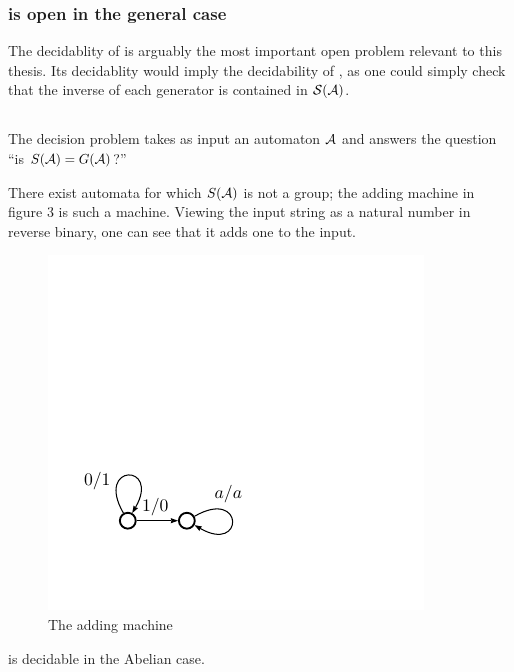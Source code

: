 \documentclass[11pt, titlepage]{article}
\begin{document}
\subsubsection{ is open in the general case}

The decidablity of  is arguably the most important
open problem relevant to this thesis. Its decidablity would imply the
decidability of , as one could simply check that the
inverse of each generator is contained in $\mathcal{S}(\mathcal{A})$.

\subsection{}
\begin{definition}
  The  decision problem takes as input an automaton
  $\mathcal{A}$ and answers the question ``is $S(\mathcal{A}) = G(\mathcal{A})$?''
\end{definition}

\begin{example}
  There exist automata for which $S(\mathcal{A})$ is not a group; the adding
  machine in figure 3 is such a machine. Viewing the input string as a
  natural number in reverse binary, one can see that it adds one to
  the input.
\end{example}
\begin{figure}
\begin{center}
\includegraphics[scale=0.7]{figures/adder}
\end{center}
\caption{The adding machine}
\end{figure}

\begin{proposition}
   is decidable in the Abelian case.
\end{proposition}
\end{document}
